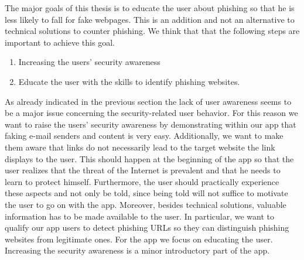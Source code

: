 The major goals of this thesis is to educate the user about phishing so that he is less likely to fall for fake webpages.
 This is an addition and not an alternative to technical solutions to counter phishing.
 We think that that the following steps are important to achieve this goal.


\begin{enumerate}
	\item Increasing the users' security awareness
	\item Educate the user with the skills to identify phishing websites.

\end{enumerate}

As already indicated in the previous section the lack of user awareness seems to be a major issue concerning the security-related user behavior.
 For this reason we want to raise the users' security awareness by demonstrating within our app that faking e-mail senders and content is very easy.
 Additionally, we want to make them aware that links do not necessarily lead to the target website the link displays to the user.
 This should happen at the beginning of the app so that the user realizes that the threat of the Internet is prevalent and that he needs to learn to protect himself.
 Furthermore, the user should practically experience these aspects and not only be told, since being told will not suffice to motivate the user to go on with the app.
 Moreover, besides technical solutions, valuable information has to be made available to the user.
 In particular, we want to qualify our app users to detect phishing URLs so they can distinguish phishing websites from legitimate ones.
 For the app we focus on educating the user.
 Increasing the security awareness is a minor introductory part of the app.





